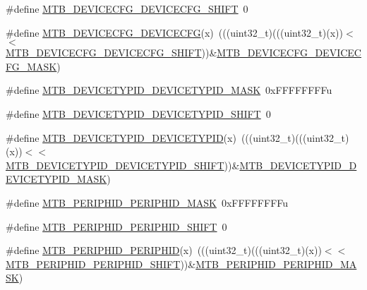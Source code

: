 \begin{DoxyCompactItemize}
\item 
\#define \hyperlink{group___m_t_b___register___masks_gac42900c87a48c38d0b310cbeb8781c81}{M\+T\+B\+\_\+\+D\+E\+V\+I\+C\+E\+C\+F\+G\+\_\+\+D\+E\+V\+I\+C\+E\+C\+F\+G\+\_\+\+S\+H\+I\+FT}~0
\item 
\#define \hyperlink{group___m_t_b___register___masks_gaa92591a7dc3aaa3c772d0ae4091130fb}{M\+T\+B\+\_\+\+D\+E\+V\+I\+C\+E\+C\+F\+G\+\_\+\+D\+E\+V\+I\+C\+E\+C\+FG}(x)~(((uint32\+\_\+t)(((uint32\+\_\+t)(x))$<$$<$\hyperlink{group___m_t_b___register___masks_gac42900c87a48c38d0b310cbeb8781c81}{M\+T\+B\+\_\+\+D\+E\+V\+I\+C\+E\+C\+F\+G\+\_\+\+D\+E\+V\+I\+C\+E\+C\+F\+G\+\_\+\+S\+H\+I\+FT}))\&\hyperlink{group___m_t_b___register___masks_ga5d8dec4596fd0f32f4b71f1fbfb71aee}{M\+T\+B\+\_\+\+D\+E\+V\+I\+C\+E\+C\+F\+G\+\_\+\+D\+E\+V\+I\+C\+E\+C\+F\+G\+\_\+\+M\+A\+SK})
\item 
\#define \hyperlink{group___m_t_b___register___masks_ga67e83a0bbb46ccb3456f83b4f1b39a86}{M\+T\+B\+\_\+\+D\+E\+V\+I\+C\+E\+T\+Y\+P\+I\+D\+\_\+\+D\+E\+V\+I\+C\+E\+T\+Y\+P\+I\+D\+\_\+\+M\+A\+SK}~0x\+F\+F\+F\+F\+F\+F\+F\+Fu
\item 
\#define \hyperlink{group___m_t_b___register___masks_ga233d82a0813df4ea2de5bdaf77f49b27}{M\+T\+B\+\_\+\+D\+E\+V\+I\+C\+E\+T\+Y\+P\+I\+D\+\_\+\+D\+E\+V\+I\+C\+E\+T\+Y\+P\+I\+D\+\_\+\+S\+H\+I\+FT}~0
\item 
\#define \hyperlink{group___m_t_b___register___masks_gaf291bcc52e0eb418b9f7ccefe6c47df2}{M\+T\+B\+\_\+\+D\+E\+V\+I\+C\+E\+T\+Y\+P\+I\+D\+\_\+\+D\+E\+V\+I\+C\+E\+T\+Y\+P\+ID}(x)~(((uint32\+\_\+t)(((uint32\+\_\+t)(x))$<$$<$\hyperlink{group___m_t_b___register___masks_ga233d82a0813df4ea2de5bdaf77f49b27}{M\+T\+B\+\_\+\+D\+E\+V\+I\+C\+E\+T\+Y\+P\+I\+D\+\_\+\+D\+E\+V\+I\+C\+E\+T\+Y\+P\+I\+D\+\_\+\+S\+H\+I\+FT}))\&\hyperlink{group___m_t_b___register___masks_ga67e83a0bbb46ccb3456f83b4f1b39a86}{M\+T\+B\+\_\+\+D\+E\+V\+I\+C\+E\+T\+Y\+P\+I\+D\+\_\+\+D\+E\+V\+I\+C\+E\+T\+Y\+P\+I\+D\+\_\+\+M\+A\+SK})
\item 
\#define \hyperlink{group___m_t_b___register___masks_ga8be09de74be8da3de47e29838b6e7ca8}{M\+T\+B\+\_\+\+P\+E\+R\+I\+P\+H\+I\+D\+\_\+\+P\+E\+R\+I\+P\+H\+I\+D\+\_\+\+M\+A\+SK}~0x\+F\+F\+F\+F\+F\+F\+F\+Fu
\item 
\#define \hyperlink{group___m_t_b___register___masks_gaf919275fec0a218a929c0b39be8c2929}{M\+T\+B\+\_\+\+P\+E\+R\+I\+P\+H\+I\+D\+\_\+\+P\+E\+R\+I\+P\+H\+I\+D\+\_\+\+S\+H\+I\+FT}~0
\item 
\#define \hyperlink{group___m_t_b___register___masks_gaa47c6aacce9de815875511283f0fe44d}{M\+T\+B\+\_\+\+P\+E\+R\+I\+P\+H\+I\+D\+\_\+\+P\+E\+R\+I\+P\+H\+ID}(x)~(((uint32\+\_\+t)(((uint32\+\_\+t)(x))$<$$<$\hyperlink{group___m_t_b___register___masks_gaf919275fec0a218a929c0b39be8c2929}{M\+T\+B\+\_\+\+P\+E\+R\+I\+P\+H\+I\+D\+\_\+\+P\+E\+R\+I\+P\+H\+I\+D\+\_\+\+S\+H\+I\+FT}))\&\hyperlink{group___m_t_b___register___masks_ga8be09de74be8da3de47e29838b6e7ca8}{M\+T\+B\+\_\+\+P\+E\+R\+I\+P\+H\+I\+D\+\_\+\+P\+E\+R\+I\+P\+H\+I\+D\+\_\+\+M\+A\+SK})
$$
\end{DoxyCompactItemize}
